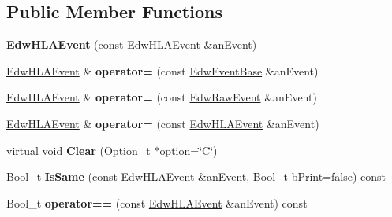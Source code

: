 \subsection*{Public Member Functions}
\begin{DoxyCompactItemize}
\item 
\hypertarget{class_edw_h_l_a_event_afa676b292994c7dbcdf36b32a8e0f529}{
{\bfseries EdwHLAEvent} (const \hyperlink{class_edw_h_l_a_event}{EdwHLAEvent} \&anEvent)}
\label{class_edw_h_l_a_event_afa676b292994c7dbcdf36b32a8e0f529}

\item 
\hypertarget{class_edw_h_l_a_event_acd60ef46946b12a0b7212d60049cad77}{
\hyperlink{class_edw_h_l_a_event}{EdwHLAEvent} \& {\bfseries operator=} (const \hyperlink{class_edw_event_base}{EdwEventBase} \&anEvent)}
\label{class_edw_h_l_a_event_acd60ef46946b12a0b7212d60049cad77}

\item 
\hypertarget{class_edw_h_l_a_event_a161b970e680ea8a95fa0618e30217460}{
\hyperlink{class_edw_h_l_a_event}{EdwHLAEvent} \& {\bfseries operator=} (const \hyperlink{class_edw_raw_event}{EdwRawEvent} \&anEvent)}
\label{class_edw_h_l_a_event_a161b970e680ea8a95fa0618e30217460}

\item 
\hypertarget{class_edw_h_l_a_event_a26368b925577f3d26cb7e46d89d6a217}{
\hyperlink{class_edw_h_l_a_event}{EdwHLAEvent} \& {\bfseries operator=} (const \hyperlink{class_edw_h_l_a_event}{EdwHLAEvent} \&anEvent)}
\label{class_edw_h_l_a_event_a26368b925577f3d26cb7e46d89d6a217}

\item 
\hypertarget{class_edw_h_l_a_event_a894c208e743dfeaa99266e248fa38e55}{
virtual void {\bfseries Clear} (Option\_\-t $\ast$option=\char`\"{}C\char`\"{})}
\label{class_edw_h_l_a_event_a894c208e743dfeaa99266e248fa38e55}

\item 
\hypertarget{class_edw_h_l_a_event_ab630d9748528d94bfdd6fd3b3e576d52}{
Bool\_\-t {\bfseries IsSame} (const \hyperlink{class_edw_h_l_a_event}{EdwHLAEvent} \&anEvent, Bool\_\-t bPrint=false) const }
\label{class_edw_h_l_a_event_ab630d9748528d94bfdd6fd3b3e576d52}

\item 
\hypertarget{class_edw_h_l_a_event_a600f7b36a7a8890a3763867cdc2fb461}{
Bool\_\-t {\bfseries operator==} (const \hyperlink{class_edw_h_l_a_event}{EdwHLAEvent} \&anEvent) const }
\label{class_edw_h_l_a_event_a600f7b36a7a8890a3763867cdc2fb461}


\end{DoxyCompactItemize}
